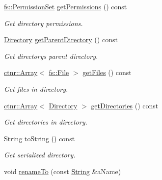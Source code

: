 \begin{DoxyCompactItemize}
\mbox{\hyperlink{classlibrary_1_1core_1_1fs_1_1_permission_set}{fs\+::\+Permission\+Set}} \mbox{\hyperlink{classlibrary_1_1core_1_1fs_1_1_directory_a2214a988c6a3d2b168768d83dfa17225}{get\+Permissions}} () const
\begin{DoxyCompactList}\small\item\em Get directory permissions. \end{DoxyCompactList}\item 
\mbox{\hyperlink{classlibrary_1_1core_1_1fs_1_1_directory}{Directory}} \mbox{\hyperlink{classlibrary_1_1core_1_1fs_1_1_directory_ad17e782b4937e026064cf90e5b6150e6}{get\+Parent\+Directory}} () const
\begin{DoxyCompactList}\small\item\em Get directory\textquotesingle{}s parent directory. \end{DoxyCompactList}\item 
\mbox{\hyperlink{classlibrary_1_1core_1_1ctnr_1_1_array}{ctnr\+::\+Array}}$<$ \mbox{\hyperlink{classlibrary_1_1core_1_1fs_1_1_file}{fs\+::\+File}} $>$ \mbox{\hyperlink{classlibrary_1_1core_1_1fs_1_1_directory_a9c80c3a09389bb6f024e9a9001dea432}{get\+Files}} () const
\begin{DoxyCompactList}\small\item\em Get files in directory. \end{DoxyCompactList}\item 
\mbox{\hyperlink{classlibrary_1_1core_1_1ctnr_1_1_array}{ctnr\+::\+Array}}$<$ \mbox{\hyperlink{classlibrary_1_1core_1_1fs_1_1_directory}{Directory}} $>$ \mbox{\hyperlink{classlibrary_1_1core_1_1fs_1_1_directory_ab933053d4585e10b83ee66f9cf499249}{get\+Directories}} () const
\begin{DoxyCompactList}\small\item\em Get directories in directory. \end{DoxyCompactList}\item 
\mbox{\hyperlink{classlibrary_1_1core_1_1types_1_1_string}{String}} \mbox{\hyperlink{classlibrary_1_1core_1_1fs_1_1_directory_a9d9751fccc93342105d3ea3ee29e3a9f}{to\+String}} () const
\begin{DoxyCompactList}\small\item\em Get serialized directory. \end{DoxyCompactList}\item 
void \mbox{\hyperlink{classlibrary_1_1core_1_1fs_1_1_directory_a895ac94a625098aa05a2239cfaf5359b}{rename\+To}} (const \mbox{\hyperlink{classlibrary_1_1core_1_1types_1_1_string}{String}} \&a\+Name)

\end{DoxyCompactItemize}
